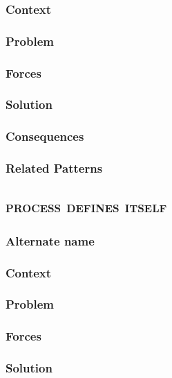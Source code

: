 \documentclass[prodmode]{style/acmlarge}
\begin{document}
\subsubsection*{Context}

\subsubsection*{Problem}

\subsubsection*{Forces}

\subsubsection*{Solution}

\subsubsection*{Consequences}

\subsubsection*{Related Patterns}



\subsection{\textsc{\textbf{process defines itself}}}

\subsubsection*{Alternate name}

\subsubsection*{Context}

\subsubsection*{Problem}

\subsubsection*{Forces}

\subsubsection*{Solution}
\end{document}
